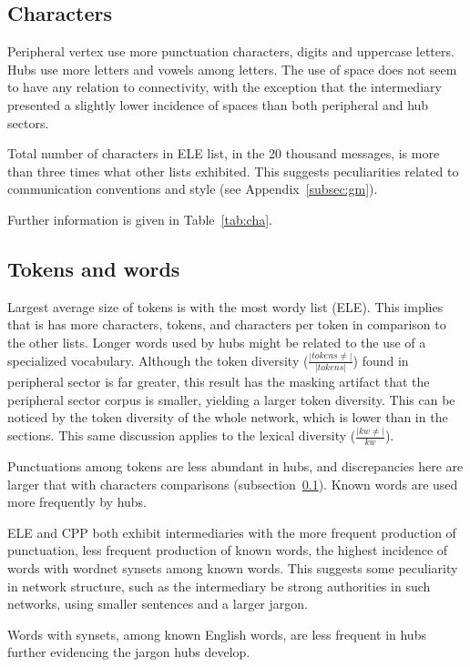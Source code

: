 \documentclass[%
 aip,
 jmp,%
 amsmath,amssymb,
 reprint,%
]{revtex4-1}
\begin{document}
\subsection{Characters}\label{sec:cha}
Peripheral vertex use more punctuation characters, digits and uppercase letters. Hubs use more letters and vowels among letters. The use of space does not seem to have any relation to connectivity, with the exception that the intermediary presented a slightly lower incidence of spaces than both peripheral and hub sectors. 
    
Total number of characters in ELE list, in the 20 thousand messages, is more than three times what other lists exhibited. This suggests peculiarities related to communication conventions and style (see Appendix~\ref{subsec:gm}).

Further information is given in Table~\ref{tab:cha}.

\subsection{Tokens and words}\label{subsec:tw}

Largest average size of tokens is with  the most wordy list (ELE). This implies that is has more characters, tokens, and characters per token in comparison to the other lists. Longer words used by hubs might be related to the use of a specialized vocabulary. Although the token diversity ($\frac{|tokens \neq|}{|tokens|}$) found in peripheral sector is far greater, this result has the masking artifact that the peripheral sector corpus is smaller, yielding a larger token diversity. This can be noticed by the token diversity of the whole network, which is lower than in the sections. This same discussion applies to the lexical diversity ($\frac{|kw\neq|}{kw}$).

Punctuations among tokens are less abundant in hubs, and discrepancies here are larger that with characters comparisons (subsection~\ref{sec:cha}). Known words are used more frequently by hubs.

ELE and CPP both exhibit intermediaries with the more frequent production of punctuation, less frequent production of known words, the highest incidence of words with wordnet synsets among known words. This suggests some peculiarity in network structure, such as the intermediary be strong authorities in such networks, using smaller sentences and a larger jargon.

Words with synsets, among known English words, are less frequent in hubs further evidencing the jargon hubs develop.
\end{document}
